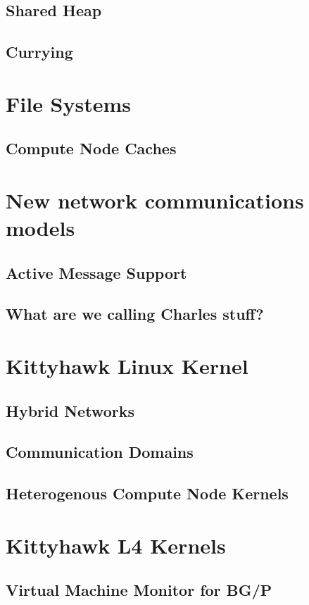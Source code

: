 \subsection{Shared Heap}
\subsection{Currying}
\section{File Systems}
\subsection{Compute Node Caches}
\section{New network communications models}
\subsection{Active Message Support}
\subsection{What are we calling Charles stuff?}
\section{Kittyhawk Linux Kernel}
\subsection{Hybrid Networks}
\subsection{Communication Domains}
\subsection{Heterogenous Compute Node Kernels}
\section{Kittyhawk L4 Kernels}
\subsection{Virtual Machine Monitor for BG/P}

